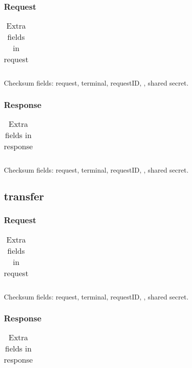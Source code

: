 \documentclass[a4paper,11pt]{article}
\newcommand{\code}[1]
   {\textsf{#1}}
\begin{document}
\subsubsection{Request}
\begin{table}[!h]
  \begin{tabular}{|l|l|}
    \hline
       \\\hline
  \end{tabular} 
  \caption{Extra fields in \code{} request}
\end{table}

Checksum fields: request, terminal, requestID, , shared secret.

\subsubsection{Response}
\begin{table}[!h]
  \begin{tabular}{|l|l|}
    \hline
       \\\hline
  \end{tabular} 
  \caption{Extra fields in \code{} response}
\end{table}

Checksum fields: request, terminal, requestID, , shared secret.


\subsection{transfer}

\subsubsection{Request}
\begin{table}[!h]
  \begin{tabular}{|l|l|}
    \hline
       \\\hline
  \end{tabular} 
  \caption{Extra fields in \code{} request}
\end{table}

Checksum fields: request, terminal, requestID, , shared secret.

\subsubsection{Response}
\begin{table}[!h]
  \begin{tabular}{|l|l|}
    \hline
       \\\hline
  \end{tabular} 
  \caption{Extra fields in \code{} response}
\end{table}
\end{document}
